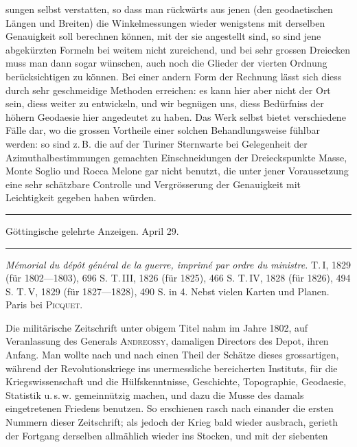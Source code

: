 %
sungen selbst verstatten, so dass man rückwärts aus jenen (den geodaetischen Längen und Breiten) die Winkelmessungen wieder wenigstens mit derselben Genauigkeit soll berechnen können, mit der sie angestellt sind, so sind jene abgekürzten Formeln bei weitem nicht zureichend, und bei sehr grossen Dreiecken muss man dann sogar wünschen, auch noch die Glieder der vierten Ordnung berücksichtigen zu können. Bei einer andern Form der Rechnung lässt sich diess durch sehr geschmeidige Methoden erreichen: es kann hier aber nicht der Ort sein, diess weiter zu entwickeln, und wir begnügen uns, diess Bedürfniss der höhern Geodaesie hier angedeutet zu haben. Das Werk selbst bietet verschiedene Fälle dar, wo die grossen Vortheile einer solchen Behandlungsweise fühlbar werden: so sind z.\,B. die auf der Turiner Sternwarte bei Gelegenheit der Azimuthalbestimmungen gemachten Einschneidungen der Dreieckspunkte Masse, Monte Soglio und Rocca Melone gar nicht benutzt, die unter jener Voraussetzung eine sehr schätzbare Controlle und Vergrösserung der Genauigkeit mit Leichtigkeit gegeben haben würden.

\begin{center}
\rule{.85\textwidth}{.3pt}\par
Göttingische gelehrte Anzeigen. April 29.\par
\rule{.85\textwidth}{.3pt}
\end{center}
\hspace*{\parindent}\textit{Mémorial du dépôt général de la guerre, imprimé par ordre du ministre.} T.\,I, 1829 (für 1802---1803), 696 S. T.\,III, 1826 (für 1825), 466 S. T.\,IV, 1828 (für 1826), 494 S. T.\,V, 1829 (für 1827---1828), 490 S. in 4. Nebst vielen Karten und Planen. Paris bei \textsc{Picquet}.

Die militärische Zeitschrift unter obigem Titel nahm im Jahre 1802, auf Veranlassung des Generals \textsc{Andreossy}, damaligen Directors des Depot, ihren Anfang. Man wollte nach und nach einen Theil der Schätze dieses grossartigen, während der Revolutionskriege ins unermessliche bereicherten Instituts, für die Kriegswissenschaft und die Hülfskenntnisse, Geschichte, Topographie, Geodaesie, Statistik u.\,s.\,w. gemeinnützig machen, und dazu die Musse des damals eingetretenen Friedens benutzen. So erschienen rasch nach einander die ersten Nummern dieser Zeitschrift; als jedoch der Krieg bald wieder ausbrach, gerieth der Fortgang derselben allmählich wieder ins Stocken, und mit der siebenten
